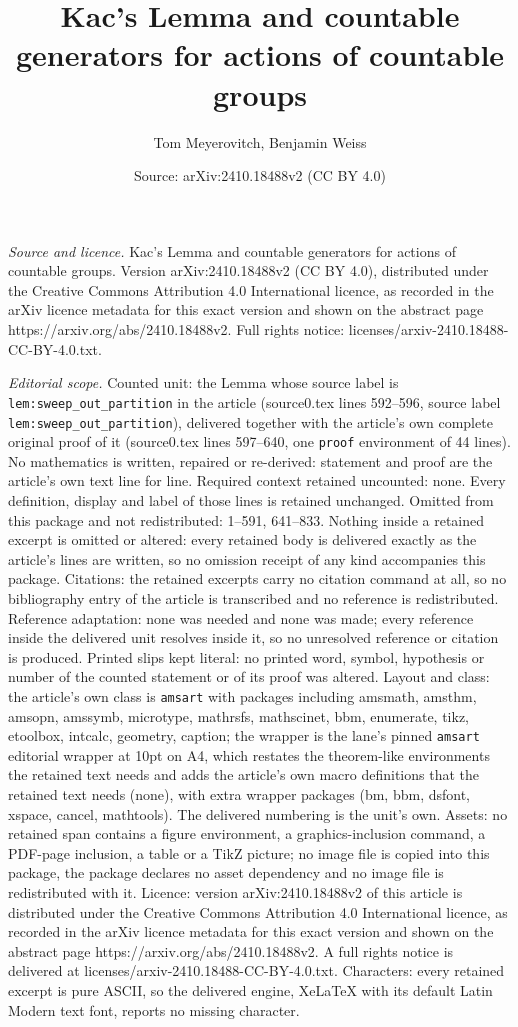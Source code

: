 \documentclass[10pt,a4paper]{amsart}
\title[Kac's Lemma and countable generators for actions of countabl]{Kac's Lemma and countable generators for actions of countable groups}
\author{Tom Meyerovitch, Benjamin Weiss}
\date{Source: arXiv:2410.18488v2 (CC BY 4.0)}
\begin{document}
\maketitle

\noindent\emph{Source and licence.} Kac's Lemma and countable generators for actions of countable groups. Version arXiv:2410.18488v2 (CC BY 4.0), distributed under the Creative Commons Attribution 4.0 International licence, as recorded in the arXiv licence metadata for this exact version and shown on the abstract page https://arxiv.org/abs/2410.18488v2. Full rights notice: licenses/arxiv-2410.18488-CC-BY-4.0.txt.\par\smallskip

\noindent\textit{Editorial scope.} Counted unit: the Lemma whose source label is \texttt{lem:sweep\_out\_partition} in the article (source0.tex lines 592--596, source label \texttt{lem:sweep\_out\_partition}), delivered together with the article's own complete original proof of it (source0.tex lines 597--640, one \texttt{proof} environment of 44 lines). No mathematics is written, repaired or re-derived: statement and proof are the article's own text line for line. Required context retained uncounted: none. Every definition, display and label of those lines is retained unchanged. Omitted from this package and not redistributed: 1--591, 641--833. Nothing inside a retained excerpt is omitted or altered: every retained body is delivered exactly as the article's lines are written, so no omission receipt of any kind accompanies this package. Citations: the retained excerpts carry no citation command at all, so no bibliography entry of the article is transcribed and no reference is redistributed. Reference adaptation: none was needed and none was made; every reference inside the delivered unit resolves inside it, so no unresolved reference or citation is produced. Printed slips kept literal: no printed word, symbol, hypothesis or number of the counted statement or of its proof was altered. Layout and class: the article's own class is \texttt{amsart} with packages including amsmath, amsthm, amsopn, amssymb, microtype, mathrsfs, mathscinet, bbm, enumerate, tikz, etoolbox, intcalc, geometry, caption; the wrapper is the lane's pinned \texttt{amsart} editorial wrapper at 10pt on A4, which restates the theorem-like environments the retained text needs and adds the article's own macro definitions that the retained text needs (none), with extra wrapper packages (bm, bbm, dsfont, xspace, cancel, mathtools). The delivered numbering is the unit's own. Assets: no retained span contains a figure environment, a graphics-inclusion command, a PDF-page inclusion, a table or a TikZ picture; no image file is copied into this package, the package declares no asset dependency and no image file is redistributed with it. Licence: version arXiv:2410.18488v2 of this article is distributed under the Creative Commons Attribution 4.0 International licence, as recorded in the arXiv licence metadata for this exact version and shown on the abstract page https://arxiv.org/abs/2410.18488v2. A full rights notice is delivered at licenses/arxiv-2410.18488-CC-BY-4.0.txt. Characters: every retained excerpt is pure ASCII, so the delivered engine, XeLaTeX with its default Latin Modern text font, reports no missing character.
\end{document}
